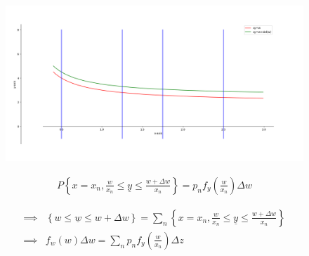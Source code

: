 \documentclass[journal,12pt,twocolumn]{beamer}
\providecommand{\brak}[1]{\ensuremath{\left(#1\right)}}
\providecommand{\cbrak}[1]{\ensuremath{\left\{#1\right\}}}
\begin{document}
	
	\begin{frame}
		\begin{figure}[H]
			\centering
			\includegraphics[width=\columnwidth]{figs/assign_8_Figure_2.png}
			\label{Fig2}	
		\end{figure} 
	\end{frame}

  \begin{frame}
	
	\begin{align}
		P\cbrak{x=x_n ,\frac{w}{x_n}\le \underline{y} \leq \frac{w+\Delta w}{x_n}} = p_nf_y\brak{\frac{w}{x_n}}\Delta w   \nonumber
	\end{align} 
	
	\begin{align}
		\implies &\cbrak{w \le \underline{w} \leq w+\Delta w} = \sum_{n} \cbrak{x=x_n ,\frac{w}{x_n}\le \underline{y} \leq \frac{w+\Delta w}{x_n}}   \\
		\implies &f_w\brak{w} \Delta w = \sum_{n} p_nf_y\brak{\frac{w}{x_n}}\Delta z
	\end{align} 
	
  \end{frame}
	
	
\end{document}
